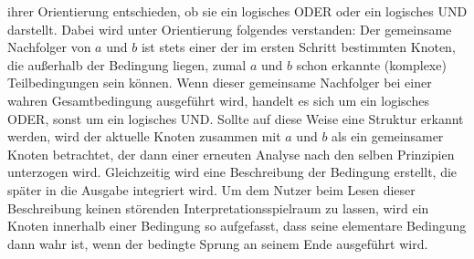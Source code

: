 \documentclass[11pt]{article}
\begin{document}
\begin{enumerate}
\begin{enumerate}
{				ihrer Orientierung entschieden, ob sie ein logisches ODER oder ein logisches
				UND darstellt. Dabei wird unter Orientierung folgendes verstanden: Der
				gemeinsame Nachfolger von $a$ und $b$ ist stets einer der im ersten Schritt
				bestimmten Knoten, die außerhalb der Bedingung liegen, zumal $a$ und $b$
				schon erkannte (komplexe) Teilbedingungen sein können. Wenn dieser gemeinsame
				Nachfolger bei einer wahren Gesamtbedingung ausgeführt wird, handelt es sich
				um ein logisches ODER, sonst um ein logisches UND. Sollte auf diese Weise eine
				Struktur erkannt werden, wird der aktuelle Knoten zusammen mit $a$ und $b$
				als ein gemeinsamer Knoten betrachtet, der dann einer erneuten Analyse nach
				den selben Prinzipien unterzogen wird. Gleichzeitig wird eine Beschreibung
				der Bedingung erstellt, die später in die Ausgabe integriert wird.
				Um dem Nutzer beim Lesen dieser Beschreibung keinen störenden
				Interpretationsspielraum zu lassen, wird ein Knoten innerhalb einer Bedingung
				so aufgefasst, dass seine elementare Bedingung dann wahr ist, wenn der
				bedingte Sprung an seinem Ende ausgeführt wird.}
		\end{enumerate}
\end{enumerate}
\end{document}
